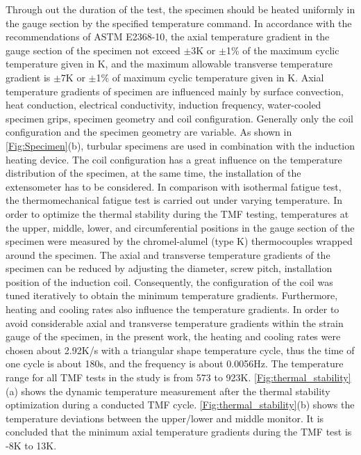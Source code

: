 Through out the duration of the test, the specimen should be heated uniformly in the gauge section by the specified temperature command. In accordance with the recommendations of ASTM E2368-10\cite{ASTME2005}, the axial temperature gradient in the gauge section of the specimen not exceed $\pm$3K or $\pm$1\% of the
maximum cyclic temperature given in K, and the maximum allowable transverse temperature gradient is $\pm$7K or $\pm$1\% of maximum cyclic temperature given in K.
Axial temperature gradients of specimen are influenced mainly by surface convection, heat conduction, electrical conductivity, induction frequency, water-cooled specimen grips, specimen geometry and coil configuration. Generally only the coil configuration and the specimen geometry are variable. As shown in \ref{Fig:Specimen}(b), turbular specimens are used in combination with the induction heating device. The coil configuration has a great influence on the temperature distribution of the specimen, at the same time, the installation of the extensometer has to be considered\cite{Hahner2006}.
In comparison with isothermal fatigue test, the thermomechanical fatigue test is carried out under varying temperature.
In order to optimize the thermal stability during the TMF testing, temperatures at the upper, middle, lower, and circumferential positions in the gauge section of the specimen were measured by the chromel-alumel (type K) thermocouples wrapped around the specimen.
The axial and transverse temperature gradients of the specimen can be reduced by adjusting the diameter, screw pitch, installation position of the induction coil.
Consequently, the configuration of the coil was tuned iteratively to obtain the minimum temperature gradients.
Furthermore, heating and cooling rates also influence the temperature gradients.
In order to avoid considerable axial and transverse temperature gradients within the strain gauge of the specimen, in the present work, the heating and cooling rates were chosen about 2.92K/s with a triangular shape temperature cycle, thus the time of one cycle is about 180s, and the frequency is about 0.0056Hz.
The temperature range for all TMF tests in the study is from 573 to 923K. \ref{Fig:thermal_stability}(a) shows the dynamic temperature measurement after the thermal stability optimization during a conducted TMF cycle. \ref{Fig:thermal_stability}(b) shows the temperature
deviations between the upper/lower and middle monitor. It is concluded that the minimum axial temperature gradients during the TMF test is -8K to 13K.

